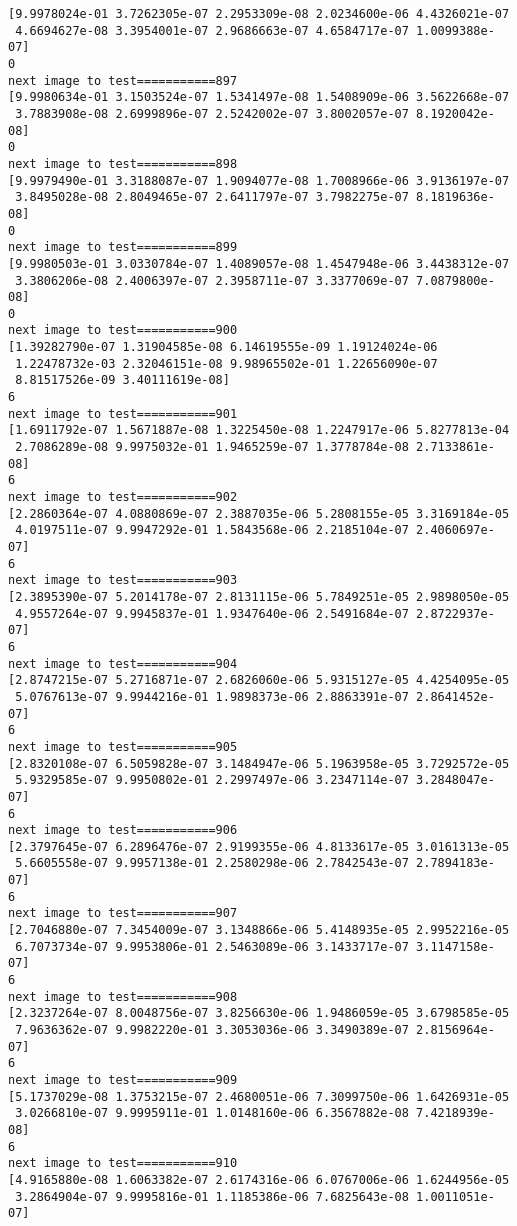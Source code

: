 \documentclass[11pt]{article}
\begin{document}
\begin{Verbatim}[commandchars=\\\{\}]
[9.9978024e-01 3.7262305e-07 2.2953309e-08 2.0234600e-06 4.4326021e-07
 4.6694627e-08 3.3954001e-07 2.9686663e-07 4.6584717e-07 1.0099388e-07]
0
next image to test===========897
[9.9980634e-01 3.1503524e-07 1.5341497e-08 1.5408909e-06 3.5622668e-07
 3.7883908e-08 2.6999896e-07 2.5242002e-07 3.8002057e-07 8.1920042e-08]
0
next image to test===========898
[9.9979490e-01 3.3188087e-07 1.9094077e-08 1.7008966e-06 3.9136197e-07
 3.8495028e-08 2.8049465e-07 2.6411797e-07 3.7982275e-07 8.1819636e-08]
0
next image to test===========899
[9.9980503e-01 3.0330784e-07 1.4089057e-08 1.4547948e-06 3.4438312e-07
 3.3806206e-08 2.4006397e-07 2.3958711e-07 3.3377069e-07 7.0879800e-08]
0
next image to test===========900
[1.39282790e-07 1.31904585e-08 6.14619555e-09 1.19124024e-06
 1.22478732e-03 2.32046151e-08 9.98965502e-01 1.22656090e-07
 8.81517526e-09 3.40111619e-08]
6
next image to test===========901
[1.6911792e-07 1.5671887e-08 1.3225450e-08 1.2247917e-06 5.8277813e-04
 2.7086289e-08 9.9975032e-01 1.9465259e-07 1.3778784e-08 2.7133861e-08]
6
next image to test===========902
[2.2860364e-07 4.0880869e-07 2.3887035e-06 5.2808155e-05 3.3169184e-05
 4.0197511e-07 9.9947292e-01 1.5843568e-06 2.2185104e-07 2.4060697e-07]
6
next image to test===========903
[2.3895390e-07 5.2014178e-07 2.8131115e-06 5.7849251e-05 2.9898050e-05
 4.9557264e-07 9.9945837e-01 1.9347640e-06 2.5491684e-07 2.8722937e-07]
6
next image to test===========904
[2.8747215e-07 5.2716871e-07 2.6826060e-06 5.9315127e-05 4.4254095e-05
 5.0767613e-07 9.9944216e-01 1.9898373e-06 2.8863391e-07 2.8641452e-07]
6
next image to test===========905
[2.8320108e-07 6.5059828e-07 3.1484947e-06 5.1963958e-05 3.7292572e-05
 5.9329585e-07 9.9950802e-01 2.2997497e-06 3.2347114e-07 3.2848047e-07]
6
next image to test===========906
[2.3797645e-07 6.2896476e-07 2.9199355e-06 4.8133617e-05 3.0161313e-05
 5.6605558e-07 9.9957138e-01 2.2580298e-06 2.7842543e-07 2.7894183e-07]
6
next image to test===========907
[2.7046880e-07 7.3454009e-07 3.1348866e-06 5.4148935e-05 2.9952216e-05
 6.7073734e-07 9.9953806e-01 2.5463089e-06 3.1433717e-07 3.1147158e-07]
6
next image to test===========908
[2.3237264e-07 8.0048756e-07 3.8256630e-06 1.9486059e-05 3.6798585e-05
 7.9636362e-07 9.9982220e-01 3.3053036e-06 3.3490389e-07 2.8156964e-07]
6
next image to test===========909
[5.1737029e-08 1.3753215e-07 2.4680051e-06 7.3099750e-06 1.6426931e-05
 3.0266810e-07 9.9995911e-01 1.0148160e-06 6.3567882e-08 7.4218939e-08]
6
next image to test===========910
[4.9165880e-08 1.6063382e-07 2.6174316e-06 6.0767006e-06 1.6244956e-05
 3.2864904e-07 9.9995816e-01 1.1185386e-06 7.6825643e-08 1.0011051e-07]

\end{Verbatim}
\end{document}
